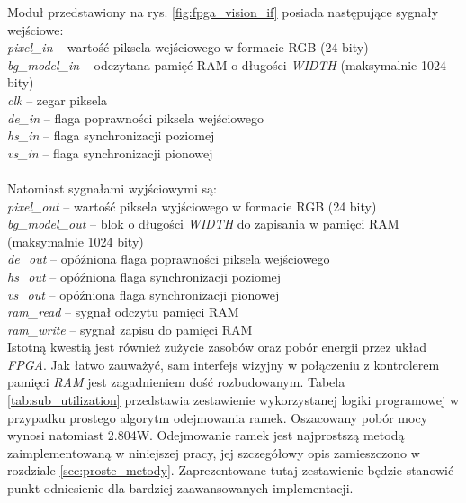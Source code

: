\noindent Moduł przedstawiony na rys. \ref{fig:fpga_vision_if} posiada następujące sygnały wejściowe:\\
\-\hspace{1cm} \textit{pixel\_in} -- wartość piksela wejściowego w formacie RGB (24 bity)\\
\-\hspace{1cm} \textit{bg\_model\_in} -- odczytana pamięć RAM o długości \textit{WIDTH} (maksymalnie 1024 bity)\\
\-\hspace{1cm} \textit{clk} -- zegar piksela\\
\-\hspace{1cm} \textit{de\_in} -- flaga poprawności piksela wejściowego\\
\-\hspace{1cm} \textit{hs\_in} -- flaga synchronizacji poziomej\\
\-\hspace{1cm} \textit{vs\_in} -- flaga synchronizacji pionowej\\\\
%
Natomiast sygnałami wyjściowymi są:\\
\-\hspace{1cm} \textit{pixel\_out} -- wartość piksela wyjściowego w formacie RGB (24 bity)\\
\-\hspace{1cm} \textit{bg\_model\_out} -- blok o długości \textit{WIDTH} do zapisania w pamięci RAM (maksymalnie 1024 bity)\\
\-\hspace{1cm} \textit{de\_out} -- opóźniona flaga poprawności piksela wejściowego\\
\-\hspace{1cm} \textit{hs\_out} -- opóźniona flaga synchronizacji poziomej\\
\-\hspace{1cm} \textit{vs\_out} -- opóźniona flaga synchronizacji pionowej\\
\-\hspace{1cm} \textit{ram\_read} -- sygnał odczytu pamięci RAM\\
\-\hspace{1cm} \textit{ram\_write} -- sygnał zapisu do pamięci RAM\\

Istotną kwestią jest również zużycie zasobów oraz pobór energii przez układ \textit{FPGA}. Jak łatwo zauważyć, sam interfejs wizyjny w połączeniu z kontrolerem pamięci \textit{RAM} jest zagadnieniem dość rozbudowanym. Tabela \ref{tab:sub_utilization} przedstawia zestawienie wykorzystanej logiki programowej w przypadku prostego algorytm odejmowania ramek. Oszacowany pobór mocy wynosi natomiast \num{2.804}W. Odejmowanie ramek jest najprostszą metodą zaimplementowaną w niniejszej pracy, jej szczegółowy opis zamieszczono w rozdziale \ref{sec:proste_metody}. Zaprezentowane tutaj zestawienie będzie stanowić punkt odniesienie dla bardziej zaawansowanych implementacji.  

